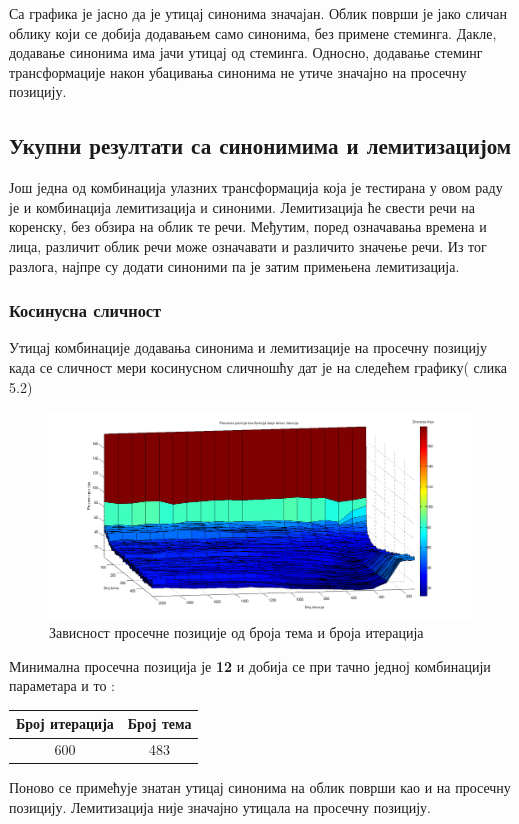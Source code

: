 Са графика је јасно да је утицај синонима значајан. Облик површи је јако сличан облику који се добија додавањем само синонима, без примене стеминга. Дакле, додавање синонима има јачи утицај од стеминга. Односно, додавање стеминг трансформације након убацивања синонима не утиче значајно на просечну позицију. 

\subsection{Укупни резултати са синонимима и лемитизацијом}

Још једна од комбинација улазних трансформација која је тестирана у овом раду је и комбинација лемитизација и синоними. Лемитизација ће свести речи на коренску, без обзира на облик те речи. Међутим, поред означавања времена и лица, различит облик речи може означавати и различито значење речи. Из тог разлога, најпре су додати синоними па је затим примењена лемитизација.

\subsubsection{Косинусна сличност}



Утицај  комбинације додавања синонима и лемитизације на просечну позицију  када се сличност мери косинусном сличношћу дат је на следећем графику( слика 5.2)


		\begin{figure}[H]
    \centering
   \includegraphics[scale=0.3]{./Slike/LemmSyn.png} 
	\caption{Зависност просечне позиције од броја тема и броја итерација}
	\label{fig:slika1}
\end{figure}

Минимална просечна позиција је \textbf{12} и добија се при тачно једној комбинацији параметара и то :

\begin{center}
\begin{tabular}{|c|c|}
\hline
Број итерација & Број тема \\
\hline\hline
600 & 483 \\

\hline
\end{tabular}
\end{center}

Поново се примећује знатан утицај синонима на облик површи као и на просечну позицију. Лемитизација није значајно утицала на просечну позицију.